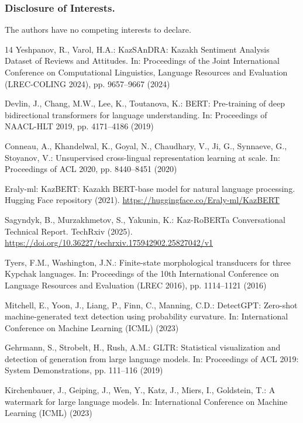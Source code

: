\documentclass[runningheads]{llncs}
\begin{document}
\subsubsection*{Disclosure of Interests.}
The authors have no competing interests to declare.

\begin{thebibliography}{14}
Yeshpanov, R., Varol, H.A.: KazSAnDRA: Kazakh Sentiment Analysis Dataset of Reviews and Attitudes. In: Proceedings of the Joint International Conference on Computational Linguistics, Language Resources and Evaluation (LREC-COLING 2024), pp. 9657--9667 (2024)

Devlin, J., Chang, M.W., Lee, K., Toutanova, K.: BERT: Pre-training of deep bidirectional transformers for language understanding. In: Proceedings of NAACL-HLT 2019, pp. 4171--4186 (2019)

Conneau, A., Khandelwal, K., Goyal, N., Chaudhary, V., Ji, G., Synnaeve, G., Stoyanov, V.: Unsupervised cross-lingual representation learning at scale. In: Proceedings of ACL 2020, pp. 8440--8451 (2020)

Eraly-ml: KazBERT: Kazakh BERT-base model for natural language processing. Hugging Face repository (2021). \url{https://huggingface.co/Eraly-ml/KazBERT}

Sagyndyk, B., Murzakhmetov, S., Yakunin, K.: Kaz-RoBERTa Conversational Technical Report. TechRxiv (2025). \url{https://doi.org/10.36227/techrxiv.175942902.25827042/v1}

Tyers, F.M., Washington, J.N.: Finite-state morphological transducers for three Kypchak languages. In: Proceedings of the 10th International Conference on Language Resources and Evaluation (LREC 2016), pp. 1114--1121 (2016)

Mitchell, E., Yoon, J., Liang, P., Finn, C., Manning, C.D.: DetectGPT: Zero-shot machine-generated text detection using probability curvature. In: International Conference on Machine Learning (ICML) (2023)

Gehrmann, S., Strobelt, H., Rush, A.M.: GLTR: Statistical visualization and detection of generation from large language models. In: Proceedings of ACL 2019: System Demonstrations, pp. 111--116 (2019)

Kirchenbauer, J., Geiping, J., Wen, Y., Katz, J., Miers, I., Goldstein, T.: A watermark for large language models. In: International Conference on Machine Learning (ICML) (2023)


\end{thebibliography}
\end{document}
